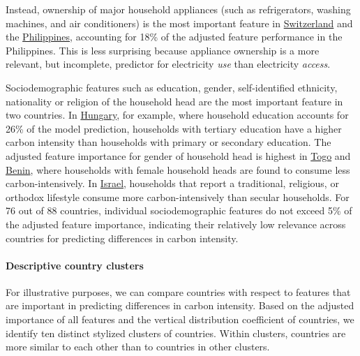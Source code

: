 \documentclass[12pt, a4paper]{article}
\begin{document}
Instead, ownership of major household appliances (such as refrigerators, washing machines, and air conditioners) is the most important feature in \hyperref[fig:5b_CHE]{Switzerland} and the \hyperref[fig:5b_PHL]{Philippines}, accounting for 18\% of the adjusted feature performance in the Philippines. This is less surprising because appliance ownership is a more relevant, but incomplete, predictor for electricity \textit{use} than electricity \textit{access}.

Sociodemographic features such as education, gender, self-identified ethnicity, nationality or religion of the household head are the most important feature in two countries. In \hyperref[fig:5b_HUN]{Hungary}, for example, where household education accounts for 26\% of the model prediction, households with tertiary education have a higher carbon intensity than households with primary or secondary education. The adjusted feature importance for gender of household head is highest in \hyperref[fig:5b_TGO]{Togo} and \hyperref[fig:5b_BEN]{Benin}, where households with female household heads are found to consume less carbon-intensively. In \hyperref[fig:5b_ISR]{Israel}, households that report a traditional, religious, or orthodox lifestyle consume more carbon-intensively than secular households. For 76 out of 88 countries, individual sociodemographic features do not exceed 5\% of the adjusted feature importance, indicating their relatively low relevance across countries for predicting differences in carbon intensity.

\paragraph{Descriptive country clusters}

For illustrative purposes, we can compare countries with respect to features that are important in predicting differences in carbon intensity. Based on the adjusted importance of all features and the vertical distribution coefficient of countries, we identify ten distinct stylized clusters of countries. Within clusters, countries are more similar to each other than to countries in other clusters. 
\end{document}
